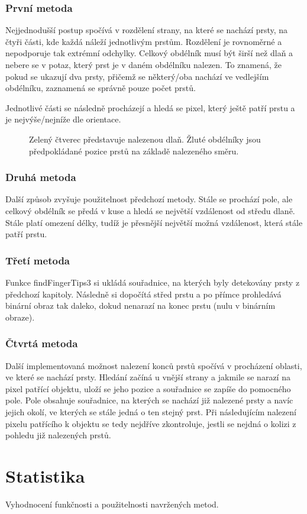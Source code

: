 \subsubsection{První metoda}
Nejjednodušší postup spočívá v rozdělení strany, na které se nachází prsty, na čtyři části, kde každá náleží jednotlivým prstům. Rozdělení je rovnoměrné a nepodporuje tak extrémní odchylky. Celkový obdélník musí být širší než dlaň a nebere se v potaz, který prst je v daném obdélníku nalezen. To znamená, že pokud se ukazují dva prsty, přičemž se některý/oba nachází ve vedlejším obdélníku, zaznamená se správně pouze počet prstů.

Jednotlivé části se následně procházejí a hledá se pixel, který ještě patří prstu a je nejvýše/nejníže dle orientace.\\

\begin{figure}[htp]
\centering
{}
\caption{Zelený čtverec představuje nalezenou dlaň. Žluté obdélníky jsou předpokládané pozice prstů na základě nalezeného směru.}
\label{pic20}
\end{figure}

\subsubsection{Druhá metoda}
Další způsob zvyšuje použitelnost předchozí metody. Stále se prochází pole, ale celkový obdélník se předá v kuse a hledá se největší vzdálenost od středu dlaně. Stále platí omezení délky, tudíž je přesnější největší možná vzdálenost, která stále patří prstu.

\subsubsection{Třetí metoda}
Funkce findFingerTips3 si ukládá souřadnice, na kterých byly detekovány prsty z předchozí kapitoly. Následně si dopočítá střed prstu a po přímce prohledává binární obraz tak daleko, dokud nenarazí na konec prstu (nulu v binárním obraze). 

\subsubsection{Čtvrtá metoda}
Další implementovaná možnost nalezení konců prstů spočívá v procházení oblasti, ve které se nachází prsty. Hledání začíná u vnější strany a jakmile se narazí na pixel patřící objektu, uloží se jeho pozice a souřadnice se zapíše do pomocného pole. Pole obsahuje souřadnice, na kterých se nachází již nalezené prsty a navíc jejich okolí, ve kterých se stále jedná o ten stejný prst. Při následujícím nalezení pixelu patřícího k objektu se tedy nejdříve zkontroluje, jestli se nejdná o kolizi z pohledu již nalezených prstů.


\section{Statistika}
Vyhodnocení funkčnosti a použitelnosti navržených metod.

\endinput
